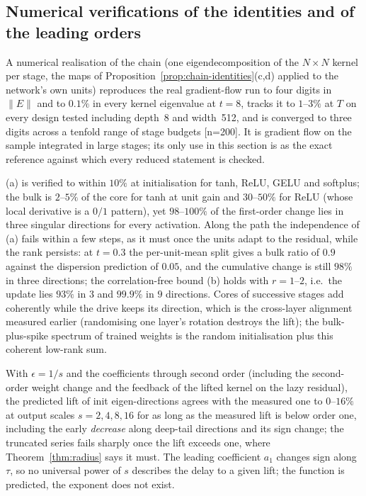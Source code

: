 \subsection{Numerical verifications of the identities and of the leading orders}
\label{app:chain-verif}

\begin{remark}
A numerical realisation of the chain (one eigendecomposition of the
$N\times N$ kernel per stage, the maps of
Proposition~\ref{prop:chain-identities}(c,d) applied to the network's own
units) reproduces the real gradient-flow run to four digits in $\|E\|$ and to
$0.1\%$ in every kernel eigenvalue at $t=8$, tracks it to $1$--$3\%$ at $T$ on
every design tested including depth~8 and width~512, and is converged to
three digits across a tenfold range of stage budgets [n=200]. It is gradient
flow on the sample integrated in large stages; its only use in this section is
as the exact reference against which every reduced statement is checked.
\end{remark}

\begin{remark}[What was measured, n=200]
(a) is verified to within $10\%$ at initialisation for tanh, ReLU, GELU and
softplus; the bulk is $2$--$5\%$ of the core for tanh at unit gain and
$30$--$50\%$ for ReLU (whose local derivative is a $0/1$ pattern), yet $98$--$100\%$
of the first-order change lies in three singular directions for every
activation. Along the path the independence of (a) fails within a few steps,
as it must once the units adapt to the residual, while the rank persists: at
$t=0.3$ the per-unit-mean split gives a bulk ratio of $0.9$ against the
dispersion prediction of $0.05$, and the cumulative change is still $98\%$ in
three directions; the correlation-free bound (b) holds with $r=1$--$2$, i.e.\
the update lies $93\%$ in $3$ and $99.9\%$ in $9$ directions. Cores of
successive stages add coherently while the drive keeps its direction, which
is the cross-layer alignment measured earlier (randomising one layer's
rotation destroys the lift); the bulk-plus-spike spectrum of trained weights
is the random initialisation plus this coherent low-rank sum.
\end{remark}

\begin{remark}[Verification, n=200]
With $\epsilon=1/s$ and the coefficients through second order (including the
second-order weight change and the feedback of the lifted kernel on the lazy
residual), the predicted lift of init eigen-directions agrees with the
measured one to $0$--$16\%$ at output scales $s=2,4,8,16$ for as long as the
measured lift is below order one, including the early \emph{decrease} along
deep-tail directions and its sign change; the truncated series fails sharply
once the lift exceeds one, where Theorem~\ref{thm:radius} says it must. The
leading coefficient $a_1$ changes sign along $\tau$, so no universal power of
$s$ describes the delay to a given lift; the function is predicted, the
exponent does not exist.
\end{remark}

